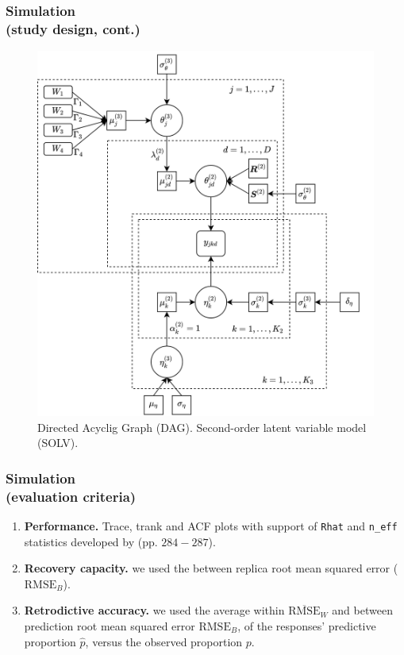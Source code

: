 \documentclass[nonav,sleutel]{beamer}
\begin{document}
	\begin{frame}
		\frametitle{Simulation \\
			(study design, cont.)}
		\begin{figure}[h]
			\centering
			\includegraphics[width=0.57\linewidth]{4_SOLV_dag}
			\caption{Directed Acyclig Graph (DAG). Second-order latent variable model (SOLV).}
			\label{fig:SOLV_model}
		\end{figure}
	\end{frame}
	\begin{frame}
		\frametitle{Simulation \\
			(evaluation criteria)}
		\begin{enumerate}
			\item \textbf{Performance.} Trace, trank and ACF plots with support of \texttt{Rhat} and \texttt{n\_eff} statistics developed by \citet{Gelman_et_al_2014} (pp. $284-287$).
			\item \textbf{Recovery capacity.} we used the between replica root mean squared error ($\text{RMSE}_{B}$).
			\item \textbf{Retrodictive accuracy.} we used the average within $\overline{\text{RMSE}}_{W}$ and between prediction root mean squared error $\text{RMSE}_{B}$, of the responses' predictive proportion $\hat{p}$, versus the observed proportion $p$.
		\end{enumerate} 
	\end{frame}
\end{document}
